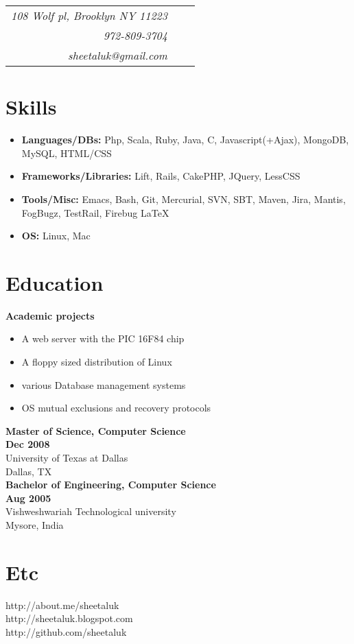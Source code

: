 \documentclass{article}
\begin{document}
\begin{minipage}[t]{3.4in}  
 \begin{tabular}{rrr}
 \vspace{0pt}
    \emph {108 Wolf pl, Brooklyn NY 11223} \\
    \emph {972-809-3704} \\
    \emph {sheetaluk@gmail.com } \\
    \end{tabular}
    \vspace{10pt}
    \section*{Skills}
      \begin{itemize}
        \item {\bf Languages/DBs:} Php, Scala, Ruby, Java, C, Javascript(+Ajax), MongoDB, MySQL, HTML/CSS
        \item {\bf Frameworks/Libraries:} Lift, Rails, CakePHP, JQuery, LessCSS
        \item {\bf Tools/Misc:} Emacs, Bash, Git, Mercurial, SVN, SBT, Maven, Jira, Mantis, FogBugz, TestRail, Firebug \LaTeX
        \item {\bf OS:} Linux, Mac
      \end{itemize}
     
    \section*{Education}
      {\bf Academic projects}
        \begin{itemize}
          \item A web server with the PIC 16F84 chip
          \item A floppy sized distribution of Linux
          \item various Database management systems
          \item OS mutual exclusions and recovery protocols\\
        \end{itemize}
        {\bf Master of Science, Computer Science} \\
        {\bf Dec 2008} \\ 
        University of Texas at Dallas \\
        Dallas, TX \\
        
        
        {\bf Bachelor of Engineering, Computer Science} \\
        {\bf Aug 2005} \\
        Vishweshwariah Technological university \\
        Mysore, India \\
        
        \section*{Etc}
        http://about.me/sheetaluk \\
        http://sheetaluk.blogspot.com \\
        http://github.com/sheetaluk
\end{minipage}
\end{document}
